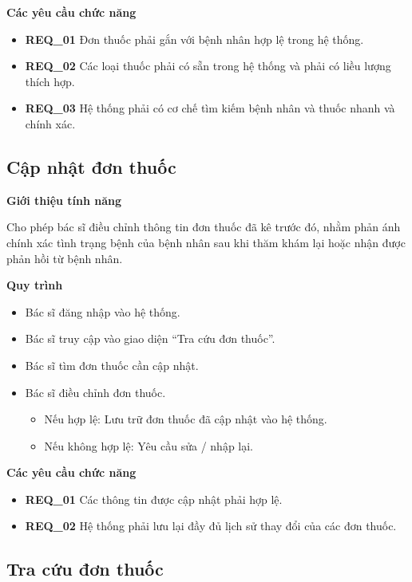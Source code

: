\noindent \textbf{Các yêu cầu chức năng}
\begin{itemize}
    \item \textbf{REQ\_01} Đơn thuốc phải gắn với bệnh nhân hợp lệ trong hệ thống.
    \item \textbf{REQ\_02} Các loại thuốc phải có sẵn trong hệ thống và phải có liều lượng thích hợp.
    \item \textbf{REQ\_03} Hệ thống phải có cơ chế tìm kiếm bệnh nhân và thuốc nhanh và chính xác.
\end{itemize}

\subsection{Cập nhật đơn thuốc}

\noindent \textbf{Giới thiệu tính năng}

Cho phép bác sĩ điều chỉnh thông tin đơn thuốc đã kê trước đó, nhằm phản ánh chính xác tình trạng bệnh của bệnh nhân sau khi thăm khám lại hoặc nhận được phản hồi từ bệnh nhân.

\noindent \textbf{Quy trình}
\begin{itemize}
    \item Bác sĩ đăng nhập vào hệ thống.
    \item Bác sĩ truy cập vào giao diện ``Tra cứu đơn thuốc''.
    \item Bác sĩ tìm đơn thuốc cần cập nhật.
    \item Bác sĩ điều chỉnh đơn thuốc.
    \begin{itemize}
        \item Nếu hợp lệ: Lưu trữ đơn thuốc đã cập nhật vào hệ thống.
        \item Nếu không hợp lệ: Yêu cầu sửa / nhập lại.
    \end{itemize}
\end{itemize}

\noindent \textbf{Các yêu cầu chức năng} 
\begin{itemize}
    \item \textbf{REQ\_01} Các thông tin được cập nhật phải hợp lệ.
    \item \textbf{REQ\_02} Hệ thống phải lưu lại đầy đủ lịch sử thay đổi của các đơn thuốc.
\end{itemize}

\subsection{Tra cứu đơn thuốc}

